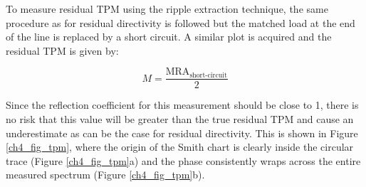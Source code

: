 \documentclass[../thesis/thesis.tex]{subfiles}
\begin{document}
To measure residual TPM using the ripple extraction technique, the same procedure as for residual directivity is followed but the matched load at the end of the line is replaced by a short circuit. A similar plot is acquired and the residual TPM is given by:

\begin{equation}
M = \frac{\textrm{MRA}_\textrm{short-circuit}}{2}
\end{equation}

Since the reflection coefficient for this measurement should be close to 1, there is no risk that this value will be greater than the true residual TPM and cause an underestimate as can be the case for residual directivity. This is shown in Figure \ref{ch4_fig_tpm}, where the origin of the Smith chart is clearly inside the circular trace (Figure \ref{ch4_fig_tpm}a) and the phase consistently wraps across the entire measured spectrum (Figure \ref{ch4_fig_tpm}b).
\end{document}

